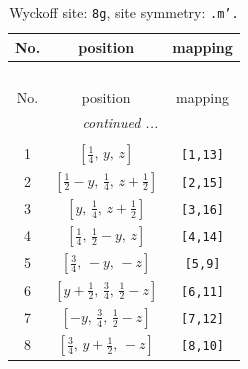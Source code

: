 \documentclass[fleqn,8pt]{jsarticle}
\begin{document}
\begin{longtable}{ccc}
\caption{Wyckoff site: {\tt 8g}, site symmetry: {\tt .m'.}}
 \\
 \hline \hline
No. & position & mapping \\ \hline \endfirsthead

\multicolumn{2}{l}{\tablename\ \thetable{}} \\
 \hline \hline
No. & position & mapping \\ \hline \endhead

 \hline \hline
\multicolumn{2}{r}{\footnotesize\it continued ...} \\ \endfoot

 \hline \hline
\multicolumn{2}{r}{} \\ \endlastfoot

1 & $\left[ \frac{1}{4},\, y,\, z \right]$ & {\tt [1,13]} \\ \hline
2 & $\left[ \frac{1}{2} - y,\, \frac{1}{4},\, z + \frac{1}{2} \right]$ & {\tt [2,15]} \\ \hline
3 & $\left[ y,\, \frac{1}{4},\, z + \frac{1}{2} \right]$ & {\tt [3,16]} \\ \hline
4 & $\left[ \frac{1}{4},\, \frac{1}{2} - y,\, z \right]$ & {\tt [4,14]} \\ \hline
5 & $\left[ \frac{3}{4},\, - y,\, - z \right]$ & {\tt [5,9]} \\ \hline
6 & $\left[ y + \frac{1}{2},\, \frac{3}{4},\, \frac{1}{2} - z \right]$ & {\tt [6,11]} \\ \hline
7 & $\left[ - y,\, \frac{3}{4},\, \frac{1}{2} - z \right]$ & {\tt [7,12]} \\ \hline
8 & $\left[ \frac{3}{4},\, y + \frac{1}{2},\, - z \right]$ & {\tt [8,10]} \\
\end{longtable}
\renewcommand{\arraystretch}{1.2}
\end{document}
